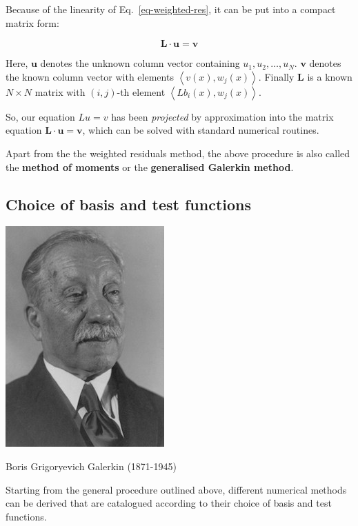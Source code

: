 Because of the linearity of Eq.~\ref{eq-weighted-res}, it can be put into a compact matrix form:

\begin{equation}
{\mathbf L} \cdot {\mathbf u} = {\mathbf v}
\end{equation} 

Here, $\mathbf u$ denotes the unknown column vector containing $u_1, u_2, \hdots, u_N$. $\mathbf v$ denotes the known column vector with elements $\left\langle v(x), w_j(x) \right\rangle$. Finally ${\mathbf L}$ is a known $N \times N$ matrix with $(i,j)$-th element $\left\langle L b_i(x), w_j(x) \right\rangle$.

So, our equation $Lu=v$ has been \emph{projected} by approximation into the matrix equation ${\mathbf L} \cdot {\mathbf u} = {\mathbf v}$, which can be solved with standard numerical routines.

Apart from the the weighted residuals method, the above procedure is also called the \textbf{method of moments} or the \textbf{generalised Galerkin method}.

\subsection{Choice of basis and test functions}

\begin{marginfigure}[-.0cm]
  \includegraphics{numeric/figures/b_galerkin}
  \caption{Boris Grigoryevich Galerkin (1871-1945)}
\end{marginfigure}

Starting from the general procedure outlined above, different numerical methods can be derived that are catalogued according to their choice of basis and test functions.

